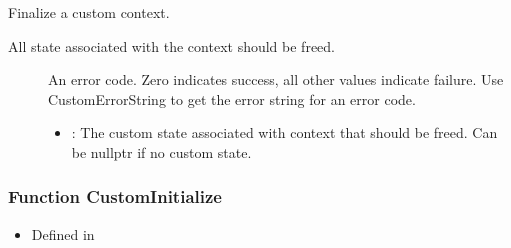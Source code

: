 \documentclass[letterpaper,10pt,english]{sphinxmanual}
\begin{document}
\begin{fulllineitems}
\label{\detokenize{cpp_api/function_custom_8h_1a9cd799dfef77db82babc6ddd4a4be707:_CPPv414CustomFinalizePv}}%
\pysigstartmultiline
{}\label{\detokenize{cpp_api/function_custom_8h_1a9cd799dfef77db82babc6ddd4a4be707:custom_8h_1a9cd799dfef77db82babc6ddd4a4be707}}%
\pysigstopmultiline
Finalize a custom context. 

All state associated with the context should be freed.

\begin{description}
\item[{}] \leavevmode
An error code. Zero indicates success, all other values indicate failure. Use CustomErrorString to get the error string for an error code. 

\item[{}] \leavevmode\begin{itemize}
\item {} 
: The custom state associated with context that should be freed. Can be nullptr if no custom state. 

\end{itemize}

\end{description}


\end{fulllineitems}



\subsubsection{Function CustomInitialize}
\label{\detokenize{cpp_api/function_custom_8h_1ad384f6af9bfb11b82b2b4e411f799b6f:function-custominitialize}}\label{\detokenize{cpp_api/function_custom_8h_1ad384f6af9bfb11b82b2b4e411f799b6f:exhale-function-custom-8h-1ad384f6af9bfb11b82b2b4e411f799b6f}}\label{\detokenize{cpp_api/function_custom_8h_1ad384f6af9bfb11b82b2b4e411f799b6f::doc}}\begin{itemize}
\item {} 
Defined in {\hyperref[\detokenize{cpp_api/file_src_servables_custom_custom.h:file-src-servables-custom-custom-h}]{}}

\end{itemize}
\end{document}
